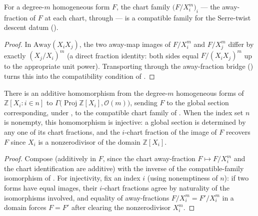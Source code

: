 \begin{lemma}
  \label{lem:serre_twist_form_compatible}
  For a degree-\(m\) homogeneous form \(F\), the chart family
  \(\bigl(F/X_i^m\bigr)_i\) --- the away-fraction of \(F\) at each chart,
  through  --- is a compatible family for the
  Serre-twist descent datum ().
\end{lemma}
\begin{proof}\leanok
  In \(\mathrm{Away}(X_i X_j)\), the two away-map images of \(F/X_i^m\) and
  \(F/X_j^m\) differ by exactly \((X_j/X_i)^m\) (a direct fraction identity:
  both sides equal \(F/(X_i X_j)^m\) up to the appropriate unit power).
  Transporting through the away-fraction bridge
  () turns this into the compatibility
  condition of .
\end{proof}

\begin{lemma}
  \label{lem:serre_twist_forms_embed}
  There is an additive homomorphism from the degree-\(m\) homogeneous forms
  of \(\mathbb Z[X_i : i \in n]\) to \(\Gamma\bigl(\operatorname{Proj}
  \mathbb Z[X_i], \mathcal O(m)\bigr)\), sending \(F\) to the global section
  corresponding, under , to the
  compatible chart family of . When the
  index set \(n\) is nonempty, this homomorphism is injective: a global
  section is determined by any one of its chart fractions, and the
  \(i\)-chart fraction of the image of \(F\) recovers \(F\) since \(X_i\) is
  a nonzerodivisor of the domain \(\mathbb Z[X_i]\).
\end{lemma}
\begin{proof}\leanok
  Compose  (additively in \(F\), since
  the chart away-fraction \(F \mapsto F/X_i^m\) and the chart identification
  are additive) with the inverse of the compatible-family isomorphism of
  . For injectivity, fix an index
  \(i\) (using nonemptiness of \(n\)): if two forms have equal images, their
  \(i\)-chart fractions agree by naturality of the isomorphisms involved,
  and equality of away-fractions \(F/X_i^m = F'/X_i^m\) in a domain forces
  \(F = F'\) after clearing the nonzerodivisor \(X_i^m\).
\end{proof}

